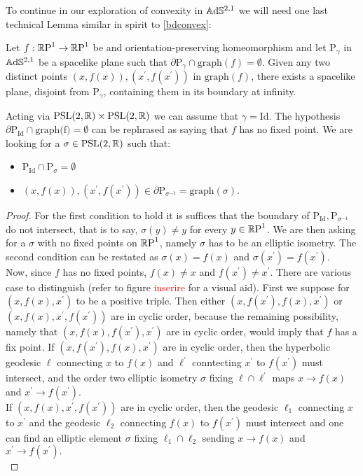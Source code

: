 To continue in our exploration of convexity in $\A^{2,1}$ we will need one last technical Lemma similar in spirit to \ref{bdconvex}: 
\begin{lemma}
    Let $f:\S\to\S$ be and orientation-preserving homeomorphism and let $\text{P}_\gamma$ in $\A^{2,1}$ be a spacelike plane such that $\partial\text{P}_\gamma\cap\text{graph}(f)=\emptyset.$ Given any two distinct points $(x,f(x)), (x^{\prime} ,f(x^{\prime} ))$ in $\text{graph}(f)$, there exists a spacelike plane, disjoint from P$_\gamma$, containing them in its boundary at infinity. 
\end{lemma}
\begin{lemma}
    Acting via $\PSL\times\PSL$ we can assume that $\gamma=\text{Id}$. The hypothesis $\partial\text{P}_{\text{Id}}\cap\text{graph(f)}=\emptyset$ can be rephrased as saying that $f$ has no fixed point. We are looking for a $\sigma\in\PSL$ such that:
    \begin{itemize}
        \item P$_{\text{Id}}\cap\text{P}_\sigma=\emptyset$ 
        \item $(x,f(x)),(x^{\prime} ,f(x^{\prime}))\in\partial\text{P}_{\sigma^{-1}}=\text{graph}(\sigma).$
    \end{itemize}
\end{lemma}
\begin{proof}
    For the first condition to hold it is suffices that the boundary of $\text{P}_{\text{Id}},\text{P}_{\sigma^{-1}}$ do not intersect, that is to say, $\sigma(y)\neq y$ for every $y\in\S$. We are then asking for a $\sigma$ with no fixed points on $\S$, namely $\sigma$ has to be an elliptic isometry. The second condition can be restated as $\sigma(x)=f(x)$ and $\sigma(x^{\prime})=f(x^{\prime}).$\\
Now, since $f$ has no fixed points, $f(x)\neq x$ and $f(x^{\prime})\neq x^{\prime}$. There are various case to distinguish (refer to figure \textcolor{red}{inserire} for a visual aid). First we suppose for $(x,f(x),x^{\prime})$ to be a positive triple. Then either $(x,f(x^{\prime}),f(x),x^{\prime})$ or $(x,f(x),x^{\prime},f(x^{\prime}))$ are in cyclic order, because the remaining possibility, namely that $(x,f(x),f(x^{\prime}) ,x^{\prime})$ are in cyclic order, would imply that $f$ has a fix point.  If $(x,f(x^{\prime}),f(x),x^{\prime})$ are in cyclic order, then the hyperbolic geodesic $\ell$ connecting $x$ to $f(x)$ and $\ell^{\prime}$ conntecting $x^{\prime} $ to $f(x^{\prime})$ must intersect, and the order two elliptic isometry $\sigma$ fixing $\ell\cap\ell^{\prime}$ maps $x\to f(x)$ and $x^{\prime} \to f(x^{\prime})$.\\
If $(x,f(x),x^{\prime},f(x^{\prime}))$ are in cyclic order, then the geodesic $\ell_1$ connecting $x$ to $x^{\prime}$ and the geodesic $\ell_2$ connecting $f(x)$ to $f(x^{\prime})$ must intersect and one can find an elliptic element $\sigma$ fixing $\ell_1\cap\ell_2$ sending $x\to f(x)$ and $x^{\prime} \to f(x^{\prime}).$\\ 
\end{proof}

